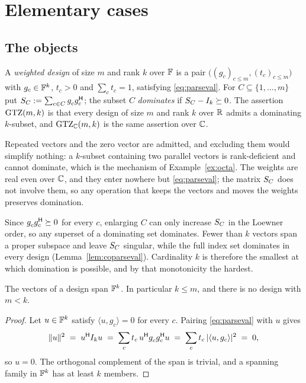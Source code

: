 \section{Elementary cases}\label{sec:first}

\subsection{The objects}

\begin{definition}\label{def:design}
A \emph{weighted design} of size $m$ and rank $k$ over $\mathbb{F}$ is a pair
$\bigl((g_c)_{c\le m},(t_c)_{c\le m}\bigr)$ with $g_c\in\mathbb{F}^k$, $t_c>0$
and $\sum_c t_c=1$, satisfying \eqref{eq:parseval}.  For
$C\subseteq\{1,\dots,m\}$ put $\SC:=\sum_{c\in C}g_c^{\vphantom{\mathsf{H}}}g_c\adj$;
the subset $C$ \emph{dominates} if $S_{C}-I_k\succeq0$.  The assertion
$\mathrm{GTZ}(m,k)$ is that every design of size $m$ and rank $k$ over $\mathbb{R}$ admits
a dominating $k$-subset, and $\mathrm{GTZ}_{\mathbb{C}}(m,k)$ is the same assertion over $\mathbb{C}$.
\end{definition}

Repeated vectors and the zero vector are admitted, and excluding them
would simplify nothing: a $k$-subset containing two parallel vectors is
rank-deficient and cannot dominate, which is the mechanism of
Example~\ref{ex:octa}.  The weights are real even over $\mathbb{C}$, and they
enter nowhere but \eqref{eq:parseval}; the matrix $S_{C}$ does not involve
them, so any operation that keeps the vectors and moves the weights
preserves domination.

Since $g_c^{\vphantom{\mathsf{H}}}g_c\adj\psd0$ for every $c$, enlarging
$C$ can only increase $S_{C}$ in the Loewner order, so any superset of a
dominating set dominates.  Fewer than $k$ vectors span a proper subspace
and leave $S_{C}$ singular, while the full index set dominates in every
design (Lemma~\ref{lem:coparseval}).  Cardinality $k$ is therefore the
smallest at which domination is possible, and by that monotonicity the
hardest.

\begin{lemma}[Lean]\label{lem:span}
The vectors of a design span $\mathbb{F}^k$.  In particular $k\le m$, and there
is no design with $m<k$.
\end{lemma}

\begin{proof}
Let $u\in\mathbb{F}^k$ satisfy $\langle u,g_c\rangle=0$ for every $c$.  Pairing
\eqref{eq:parseval} with $u$ gives
\[
  \lVert u\rVert^2\;=\;u\adj I_ku
  \;=\;\sum_c t_c\,u\adj g_c^{\vphantom{\mathsf{H}}}g_c\adj u
  \;=\;\sum_c t_c\,\lvert\langle u,g_c\rangle\rvert^2\;=\;0 ,
\]
so $u=0$.  The orthogonal complement of the span is trivial, and a
spanning family in $\mathbb{F}^k$ has at least $k$ members.
\end{proof}

